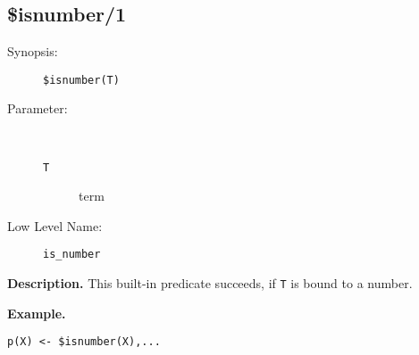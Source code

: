 %
%
%
\subsection{\$isnumber/1}

\begin{description}
\item[Synopsis:]
	{\tt \$isnumber(T)}
\item[Parameter:]\ \\[-0.5cm]
	\begin{description}
	\item[{\tt T}] term
	\end{description}
\item[Low Level Name:]
	{\tt is\_number}
\end{description}

\vspace*{0.5cm}
\noindent
{\bf Description.}
This built-in predicate succeeds, if {\tt T} is
bound to a number.

\vspace*{0.5cm}
\noindent
{\bf Example.}
\begin{verbatim}
p(X) <- $isnumber(X),...
\end{verbatim}


